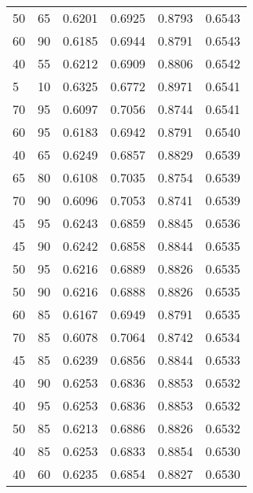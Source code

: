 \begin{center}
\begin{longtable}{|l|l|l|l|l|l|}
50                & 65                & 0.6201    & 0.6925 & 0.8793      & 0.6543    \\
60                & 90                & 0.6185    & 0.6944 & 0.8791      & 0.6543    \\
40                & 55                & 0.6212    & 0.6909 & 0.8806      & 0.6542    \\
5                 & 10                & 0.6325    & 0.6772 & 0.8971      & 0.6541    \\
70                & 95                & 0.6097    & 0.7056 & 0.8744      & 0.6541    \\
60                & 95                & 0.6183    & 0.6942 & 0.8791      & 0.6540    \\
40                & 65                & 0.6249    & 0.6857 & 0.8829      & 0.6539    \\
65                & 80                & 0.6108    & 0.7035 & 0.8754      & 0.6539    \\
70                & 90                & 0.6096    & 0.7053 & 0.8741      & 0.6539    \\
45                & 95                & 0.6243    & 0.6859 & 0.8845      & 0.6536    \\
45                & 90                & 0.6242    & 0.6858 & 0.8844      & 0.6535    \\
50                & 95                & 0.6216    & 0.6889 & 0.8826      & 0.6535    \\
50                & 90                & 0.6216    & 0.6888 & 0.8826      & 0.6535    \\
60                & 85                & 0.6167    & 0.6949 & 0.8791      & 0.6535    \\
70                & 85                & 0.6078    & 0.7064 & 0.8742      & 0.6534    \\
45                & 85                & 0.6239    & 0.6856 & 0.8844      & 0.6533    \\
40                & 90                & 0.6253    & 0.6836 & 0.8853      & 0.6532    \\
40                & 95                & 0.6253    & 0.6836 & 0.8853      & 0.6532    \\
50                & 85                & 0.6213    & 0.6886 & 0.8826      & 0.6532    \\
40                & 85                & 0.6253    & 0.6833 & 0.8854      & 0.6530    \\
40                & 60                & 0.6235    & 0.6854 & 0.8827      & 0.6530    \\

\end{longtable}
\end{center}
